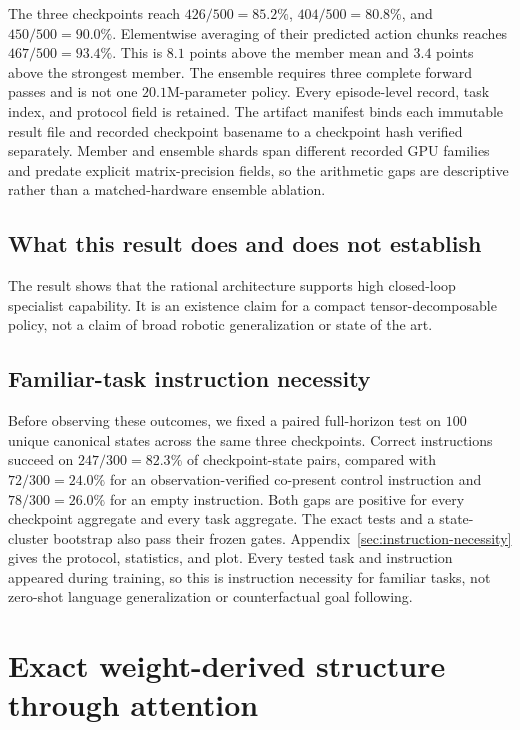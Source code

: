\documentclass{article}
\begin{document}
The three checkpoints reach $426/500=85.2\%$, $404/500=80.8\%$, and $450/500=90.0\%$.
Elementwise averaging of their predicted action chunks reaches $467/500=93.4\%$. This is $8.1$
points above the member mean and $3.4$ points above the strongest member. The ensemble requires
three complete forward passes and is not one $20.1$M-parameter policy. Every episode-level record,
task index, and protocol field is retained. The artifact manifest binds each immutable result file
and recorded checkpoint basename to a checkpoint hash verified separately. Member and ensemble
shards span different recorded GPU families and predate explicit matrix-precision fields, so the
arithmetic gaps are descriptive rather than a matched-hardware ensemble ablation.

\subsection{What this result does and does not establish}

The result shows that the rational architecture supports high closed-loop specialist capability.
It is an existence claim for a compact tensor-decomposable policy, not a
claim of broad robotic generalization or state of the art.



\subsection{Familiar-task instruction necessity}
\label{sec:instruction-necessity-summary}

Before observing these outcomes, we fixed a paired full-horizon test on $100$ unique canonical
states across the same three checkpoints. Correct instructions succeed on $247/300=82.3\%$ of
checkpoint-state pairs, compared with $72/300=24.0\%$ for an observation-verified co-present
control instruction and $78/300=26.0\%$ for an empty instruction. Both gaps are positive for every
checkpoint aggregate and every task aggregate. The exact tests and a state-cluster bootstrap also
pass their frozen gates. Appendix~\ref{sec:instruction-necessity} gives the protocol, statistics,
and plot. Every tested task and instruction appeared during training, so this is instruction
necessity for familiar tasks, not zero-shot language generalization or counterfactual goal following.

\section{Exact weight-derived structure through attention}
\label{sec:exactattention}
\end{document}

